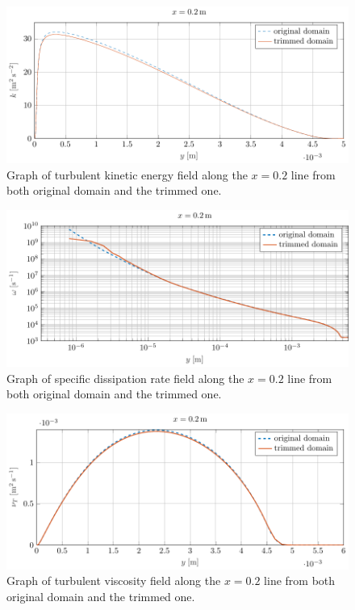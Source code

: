 \begin{figure}
\centering
\includegraphics[width=14cm]{Results/k2.pdf}
\caption{Graph of turbulent kinetic energy field along the $x=0.2$ line from both original domain and the trimmed one.}
\label{fig::k2}
\end{figure}

\begin{figure}
\centering
\includegraphics[width=14cm]{Results/omega2.pdf}
\caption{Graph of specific dissipation rate field along the $x=0.2$ line from both original domain and the trimmed one.}
\label{fig::omega2}
\end{figure}

\begin{figure}
\centering
\includegraphics[width=14cm]{Results/nut2.pdf}
\caption{Graph of turbulent viscosity field along the $x=0.2$ line from both original domain and the trimmed one.}
\label{fig::nut2}
\end{figure}

